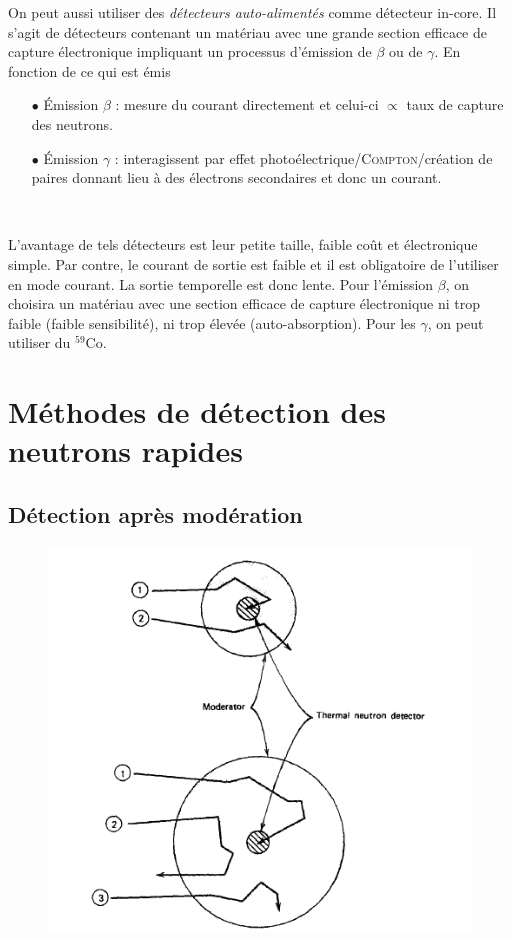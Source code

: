 On peut aussi utiliser des \textit{détecteurs auto-alimentés} comme détecteur in-core. Il s'agit
de détecteurs contenant un matériau avec une grande section efficace de capture électronique
impliquant un processus d'émission de $\beta$ ou de $\gamma$. En fonction de ce qui est émis
\begin{itemize}
\item[$\bullet$] Émission $\beta$ : mesure du courant directement et celui-ci $\propto$ taux de
capture des neutrons.
\item[$\bullet$] Émission $\gamma$ : interagissent par effet photoélectrique/\textsc{Compton}/création
de paires donnant lieu à des électrons secondaires et donc un courant.
\end{itemize}\ 

L'avantage de tels détecteurs est leur petite taille, faible coût et électronique simple. Par contre,
le courant de sortie est faible et il est obligatoire de l'utiliser en mode courant. La sortie 
temporelle est donc lente. Pour l'émission $\beta$, on choisira un matériau avec une section efficace
de capture électronique ni trop faible (faible sensibilité), ni trop élevée (auto-absorption). Pour
les $\gamma$, on peut utiliser du $^{59}$Co.

\section{Méthodes de détection des neutrons rapides}
\subsection{Détection après modération}%
	\begin{figure}
	\vspace{-5mm}
	\includegraphics[scale=0.4]{ch11/image6}
	\end{figure}

